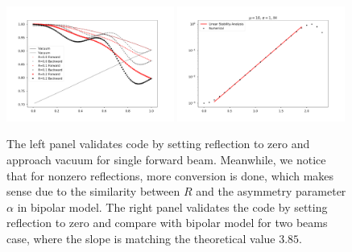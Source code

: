 \begin{figure}[htbp]
    \minipage{\textwidth}
    \includegraphics[width=0.49\textwidth]{chapters/assets/halo/halo-mu-4-r-multiple.pdf}
    \endminipage\hfill
    \minipage{\textwidth}
    \includegraphics[width=0.49\textwidth]{chapters/assets/halo/halo-mu-4-compare-bipolar.pdf}
    \endminipage\hfill
    \caption{The left panel validates code by setting reflection to zero and approach vacuum for single forward beam. Meanwhile, we notice that for nonzero reflections, more conversion is done, which makes sense due to the similarity between $R$ and the asymmetry parameter $\alpha$ in bipolar model. The right panel validates the code by setting reflection to zero and compare with bipolar model for two beams case, where the slope is matching the theoretical value $3.85$.}
    \label{chap:halo-sec:num-fig:compare-vac-bipolar}
\end{figure}

